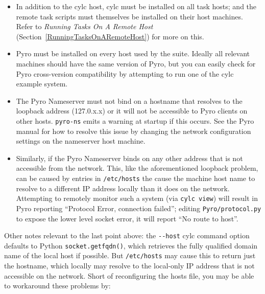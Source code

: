 \documentclass[11pt,a4paper]{article}
\begin{document}
\begin{itemize}

    \item In addition to the cylc host, cylc must be installed on all
        task hosts; and the remote task scripts must
        themselves be installed on their host machines.  Refer to {\em
        Running Tasks On A Remote Host}
        (Section~\ref{RunningTasksOnARemoteHost}) for more on this.

    \item Pyro must be installed on every host used by the suite.
         Ideally all relevant machines should have the same version of
         Pyro, but you can easily check for Pyro cross-version
         compatibility by attempting to run one of the cylc example
         system.
        
    \item The Pyro Nameserver must not bind on a hostname that resolves
        to the loopback address (127.0.x.x) or it will not be accessible
        to Pyro clients on other hosts.  \lstinline=pyro-ns= emits a
        warning at startup if this occurs.  See the Pyro manual for how
        to resolve this issue by changing the network configuration
        settings on the nameserver host machine. 

    \item Similarly, if the Pyro Nameserver binds on any other address
        that is not accessible from the network. This, like the
        aforementioned loopback problem, can be caused by entries in
        \lstinline=/etc/hosts= the cause the machine host name to
        resolve to a different IP address locally than it does on the
        network. Attempting to remotely monitor such a system (via
        \lstinline=cylc view=) will result in Pyro reporting 
        ``Protocol Error, connection failed''; editing 
        \lstinline=Pyro/protocol.py= to expose the lower level 
        socket error, it will report ``No route to host''.

\end{itemize}

Other notes relevant to the last point above: the \lstinline=--host=
cylc command option defaults to Python \lstinline=socket.getfqdn()=,
which retrieves the fully qualified domain name of the local host
if possible.  But \lstinline=/etc/hosts= may cause this to return
just the hostname, which locally may resolve to the local-only IP
address that is not accessible on the network.  Short of reconfiguring
the hosts file, you may be able to workaround these problems by:
\end{document}
